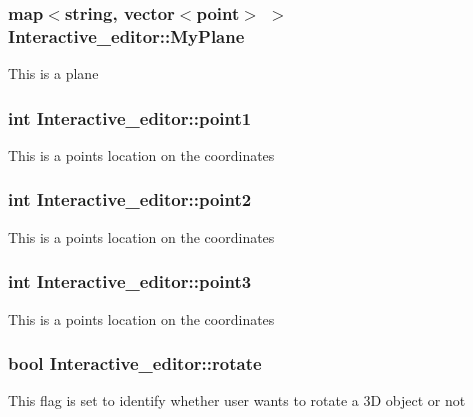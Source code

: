 \subsubsection[{\texorpdfstring{My\+Plane}{MyPlane}}]{\setlength{\rightskip}{0pt plus 5cm}map$<$string, vector$<${\bf point}$>$ $>$ Interactive\+\_\+editor\+::\+My\+Plane}\hypertarget{classInteractive__editor_a1e77c81fdaf1da82816d476fa431fc34}{}\label{classInteractive__editor_a1e77c81fdaf1da82816d476fa431fc34}
This is a plane 
\subsubsection[{\texorpdfstring{point1}{point1}}]{\setlength{\rightskip}{0pt plus 5cm}int Interactive\+\_\+editor\+::point1}\hypertarget{classInteractive__editor_a07fe2897bcad8eabf5b98e01a162b2a1}{}\label{classInteractive__editor_a07fe2897bcad8eabf5b98e01a162b2a1}
This is a point\textquotesingle{}s location on the coordinates 
\subsubsection[{\texorpdfstring{point2}{point2}}]{\setlength{\rightskip}{0pt plus 5cm}int Interactive\+\_\+editor\+::point2}\hypertarget{classInteractive__editor_af60245cb328db4c6b1ca00f1512dfc75}{}\label{classInteractive__editor_af60245cb328db4c6b1ca00f1512dfc75}
This is a point\textquotesingle{}s location on the coordinates 
\subsubsection[{\texorpdfstring{point3}{point3}}]{\setlength{\rightskip}{0pt plus 5cm}int Interactive\+\_\+editor\+::point3}\hypertarget{classInteractive__editor_a9b368072fc0a220476d21079b4bcb739}{}\label{classInteractive__editor_a9b368072fc0a220476d21079b4bcb739}
This is a point\textquotesingle{}s location on the coordinates 
\subsubsection[{\texorpdfstring{rotate}{rotate}}]{\setlength{\rightskip}{0pt plus 5cm}bool Interactive\+\_\+editor\+::rotate}\hypertarget{classInteractive__editor_a9accc369abf6972993bb5c2ba047542c}{}\label{classInteractive__editor_a9accc369abf6972993bb5c2ba047542c}
This flag is set to identify whether user wants to rotate a 3D object or not 
